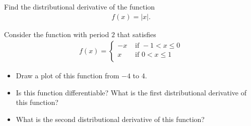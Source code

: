 \documentclass[11pt]{article}
\begin{document}
\begin{exercise}
    Find the distributional derivative of the function 
    \begin{align}
        f(x) = |x|.
    \end{align}
\end{exercise}
\begin{solution}
\end{solution}


\begin{exercise}
    Consider the function with period $2$ that satisfies 
    \begin{align}
        f(x) = \begin{cases}
                -x & \text{ if } -1 < x \leq 0 \\
                 x & \text{ if }  0 < x \leq 1 \\
               \end{cases}
    \end{align}
    \begin{itemize}
     \item Draw a plot of this function from $-4$ to $4$.
     \item Is this function differentiable? What is the first distributional derivative of this function?
     \item What is the second distributional derivative of this function?
    \end{itemize}
\end{exercise}
\begin{solution}
\end{solution}
\end{document}

